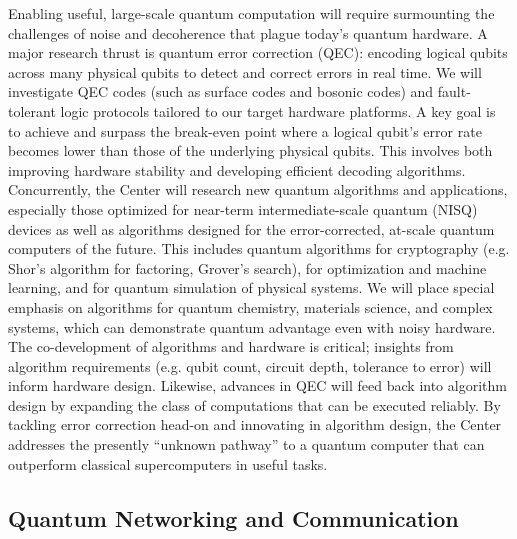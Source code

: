 \documentclass[12pt]{article}
\begin{document}
Enabling useful, large-scale quantum computation will require surmounting the challenges of noise and decoherence that plague today’s quantum hardware. A major research thrust is quantum error correction (QEC): encoding logical qubits across many physical qubits to detect and correct errors in real time. We will investigate QEC codes (such as surface codes and bosonic codes) and fault-tolerant logic protocols tailored to our target hardware platforms. A key goal is to achieve and surpass the break-even point where a logical qubit’s error rate becomes lower than those of the underlying physical qubits. This involves both improving hardware stability and developing efficient decoding algorithms. Concurrently, the Center will research new quantum algorithms and applications, especially those optimized for near-term intermediate-scale quantum (NISQ) devices as well as algorithms designed for the error-corrected, at-scale quantum computers of the future. This includes quantum algorithms for cryptography (e.g. Shor’s algorithm for factoring, Grover’s search), for optimization and machine learning, and for quantum simulation of physical systems. We will place special emphasis on algorithms for quantum chemistry, materials science, and complex systems, which can demonstrate quantum advantage even with noisy hardware. The co-development of algorithms and hardware is critical; insights from algorithm requirements (e.g. qubit count, circuit depth, tolerance to error) will inform hardware design. Likewise, advances in QEC will feed back into algorithm design by expanding the class of computations that can be executed reliably. By tackling error correction head-on and innovating in algorithm design, the Center addresses the presently “unknown pathway” to a quantum computer that can outperform classical supercomputers in useful tasks.



\subsection{Quantum Networking and Communication}
\end{document}
